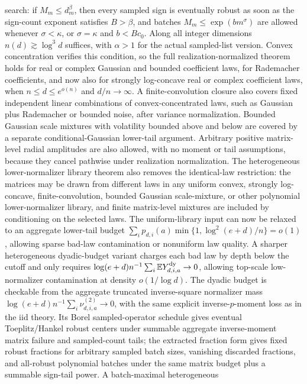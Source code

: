 \documentclass[11pt]{article}
\begin{document}
search: if \(M_m\le d_m^\beta\), then every sampled sign is eventually robust
as soon as the sign-count exponent satisfies \(B>\beta\), and batches
\(M_m\le\exp(bm^\sigma)\) are allowed whenever \(\sigma<\kappa\), or
\(\sigma=\kappa\) and \(b<Bc_0\).  Along all integer dimensions
\(n(d)\gtrsim\log^3 d\) suffices, with \(\alpha>1\) for the actual sampled-list version.
Convex
concentration verifies this condition, so the
full realization-normalized theorem holds for real or complex Gaussian and
bounded coefficient laws, for Rademacher coefficients, and now also for
strongly log-concave real or complex coefficient laws, when
\(n\le d\le e^{o(n)}\) and \(d/n\to\infty\). A finite-convolution closure also
covers fixed independent linear combinations of convex-concentrated laws, such
as Gaussian plus Rademacher or bounded noise, after variance normalization.
Bounded Gaussian scale mixtures with volatility bounded above and below are
covered by a separate conditional-Gaussian lower-tail argument. Arbitrary
positive matrix-level radial amplitudes are also allowed, with no moment or
tail assumptions, because they cancel pathwise under realization normalization.
The heterogeneous lower-normalizer library theorem also removes the identical-law
restriction: the matrices may be drawn from different laws in any uniform
convex, strongly log-concave, finite-convolution, bounded Gaussian
scale-mixture, or other polynomial lower-normalizer library, and finite
matrix-level mixtures are included by conditioning on the selected laws. The
uniform-library input can now be relaxed
to an aggregate lower-tail budget
\(\sum_i p_{d,i}(a)\min\{1,\log^2(e+d)/n\}=o(1)\), allowing sparse bad-law
contamination or nonuniform law quality. A sharper heterogeneous dyadic-budget
variant charges each bad law by depth below the cutoff and only requires
\(\log(e+d)n^{-1}\sum_i\mathbb E Y_{d,i,a}^{\rm dy}\to0\), allowing top-scale
low-normalizer contamination at density \(o(1/\log d)\). The dyadic budget is
checkable from the aggregate truncated inverse-square normalizer mass
\(\log(e+d)n^{-1}\sum_i\nu_{d,i,a}^{(2)}\to0\), with the same explicit
inverse-\(p\)-moment loss as in the iid theory. Its Borel sampled-operator
schedule gives eventual Toeplitz/Hankel robust centers under summable aggregate
inverse-moment matrix failure and sampled-count tails; the extracted fraction
form gives fixed robust fractions for arbitrary sampled batch sizes, vanishing
discarded fractions, and all-robust polynomial batches under the same matrix
budget plus a summable sign-tail power. A batch-maximal heterogeneous
\end{document}
